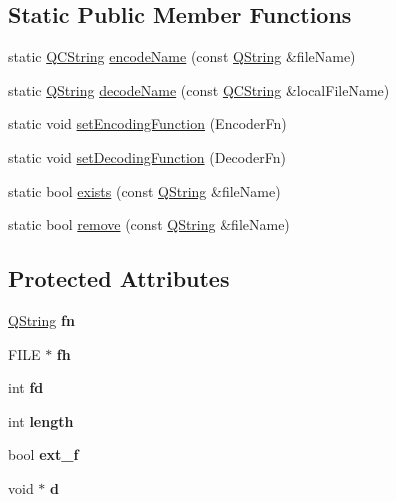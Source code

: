 \subsection*{Static Public Member Functions}
\begin{DoxyCompactItemize}
\item 
static \mbox{\hyperlink{class_q_c_string}{Q\+C\+String}} \mbox{\hyperlink{class_q_file_ad016ade1aca4b965ebb54d8bfb93d4bf}{encode\+Name}} (const \mbox{\hyperlink{class_q_string}{Q\+String}} \&file\+Name)
\item 
static \mbox{\hyperlink{class_q_string}{Q\+String}} \mbox{\hyperlink{class_q_file_ad9bf876589a366445a443cb8c7ef4df4}{decode\+Name}} (const \mbox{\hyperlink{class_q_c_string}{Q\+C\+String}} \&local\+File\+Name)
\item 
static void \mbox{\hyperlink{class_q_file_a634585187a63a52cc02d7c4578492666}{set\+Encoding\+Function}} (Encoder\+Fn)
\item 
static void \mbox{\hyperlink{class_q_file_aa71ab03f9a14cc35fe1e70dd9a392806}{set\+Decoding\+Function}} (Decoder\+Fn)
\item 
static bool \mbox{\hyperlink{class_q_file_a11a21bf641a2bda6fd2f992881f73f72}{exists}} (const \mbox{\hyperlink{class_q_string}{Q\+String}} \&file\+Name)
\item 
static bool \mbox{\hyperlink{class_q_file_aab5e02ed6b84c93b140ec6b346d41ff6}{remove}} (const \mbox{\hyperlink{class_q_string}{Q\+String}} \&file\+Name)
\end{DoxyCompactItemize}
\subsection*{Protected Attributes}
\begin{DoxyCompactItemize}
\item 
\mbox{\label{class_q_file_ae088d4677b272210ec510c55454930a4}} 
\mbox{\hyperlink{class_q_string}{Q\+String}} {\bfseries fn}
\item 
\mbox{\label{class_q_file_a1ff87fa1a08ce3d4d8ae87252f4be11a}} 
F\+I\+LE $\ast$ {\bfseries fh}
\item 
\mbox{\label{class_q_file_a69672951d3fc9e9a61f51e93eab34fc9}} 
int {\bfseries fd}
\item 
\mbox{\label{class_q_file_add1ff97139b091dcca4f3958c3dbd484}} 
int {\bfseries length}
\item 
\mbox{\label{class_q_file_ab437c510371962db31e7184e913b3cad}} 
bool {\bfseries ext\+\_\+f}
\item 
\mbox{\label{class_q_file_aa1970afffb4d3157497d2e5556dc2228}} 
void $\ast$ {\bfseries d}
\end{DoxyCompactItemize}

